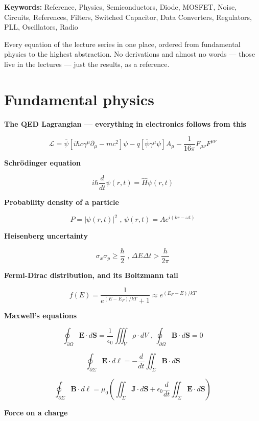 \textbf{Keywords:} Reference, Physics, Semiconductors, Diode, MOSFET,
Noise, Circuits, References, Filters, Switched Capacitor, Data
Converters, Regulators, PLL, Oscillators, Radio

Every equation of the lecture series in one place, ordered from
fundamental physics to the highest abstraction. No derivations and
almost no words --- those live in the lectures --- just the results, as
a reference.

\section{Fundamental physics}\label{fundamental-physics}

\textbf{The QED Lagrangian --- everything in electronics follows from
this}

\[ \mathcal{L} = \bar{\psi}[i \hbar c \gamma^\mu\partial_\mu - mc^2]\psi - q[\bar{\psi} \gamma^\mu \psi] A_\mu - \frac{1}{16 \pi}F_{\mu\nu}F^{\mu\nu} \]

\textbf{Schrödinger equation}

\[ i\hbar \frac{d}{dt} \psi(r,t) = \widehat{H} \psi(r,t) \]

\textbf{Probability density of a particle}

\[ P = \vert \psi(r,t)\vert ^2 \text{ , } \psi(r,t) = A e^{i(kr - \omega t)} \]

\textbf{Heisenberg uncertainty}

\[ \sigma_x \sigma_p \ge \frac{\hbar}{2} \text{ , } \Delta E \Delta t > \frac{h}{2\pi} \]

\textbf{Fermi-Dirac distribution, and its Boltzmann tail}

\[ f(E) = \frac{1}{e^{(E - E_F)/kT} + 1} \approx e^{(E_F - E)/kT} \]

\textbf{Maxwell's equations}

\[ \oint_{\partial \Omega} \mathbf{E} \cdot d\mathbf{S} = \frac{1}{\epsilon_0} \iiint_{V} \rho\cdot dV \text{ , } \oint_{\partial \Omega} \mathbf{B} \cdot d\mathbf{S} = 0 \]

\[ \oint_{\partial \Sigma} \mathbf{E} \cdot d\mathbf{\ell} = - \frac{d}{dt}\iint_\Sigma \mathbf{B}\cdot d\mathbf{S} \]

\[ \oint_{\partial \Sigma} \mathbf{B} \cdot d\mathbf{\ell} = \mu_0\left(\iint_\Sigma \mathbf{J} \cdot d\mathbf{S} + \epsilon_0 \frac{d}{dt}\iint_\Sigma\mathbf{E} \cdot d\mathbf{S} \right) \]

\textbf{Force on a charge}


